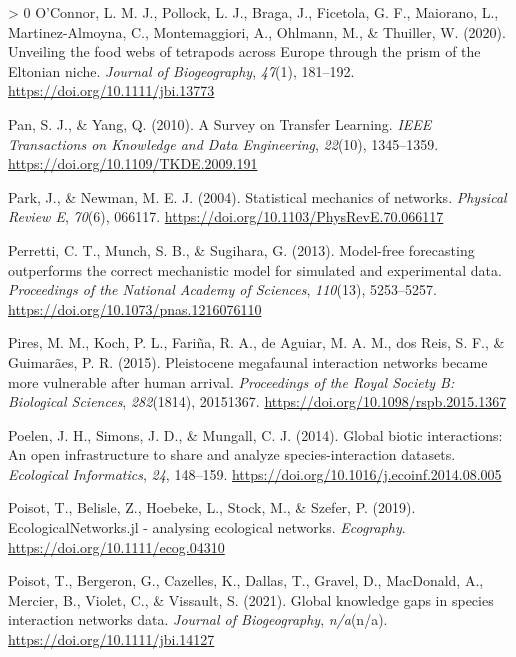 \documentclass[11pt]{article}
\newlength{\cslhangindent}
\newenvironment{CSLReferences}[3] %
 {%
  \setlength{\parindent}{0pt}
  \ifodd #1 \everypar{\setlength{\hangindent}{\cslhangindent}}\ignorespaces\fi
  \ifnum #2 > 0
  \setlength{\parskip}{#2\baselineskip}
  \fi
 }%
 {}
\begin{document}
\begin{CSLReferences}{1}{0}
\leavevmode\hypertarget{ref-OConnor2020UnvFoo}{}%
O'Connor, L. M. J., Pollock, L. J., Braga, J., Ficetola, G. F.,
Maiorano, L., Martinez-Almoyna, C., Montemaggiori, A., Ohlmann, M., \&
Thuiller, W. (2020). Unveiling the food webs of tetrapods across Europe
through the prism of the Eltonian niche. \emph{Journal of Biogeography},
\emph{47}(1), 181--192. \url{https://doi.org/10.1111/jbi.13773}

\leavevmode\hypertarget{ref-Pan2010SurTra}{}%
Pan, S. J., \& Yang, Q. (2010). A Survey on Transfer Learning.
\emph{IEEE Transactions on Knowledge and Data Engineering},
\emph{22}(10), 1345--1359. \url{https://doi.org/10.1109/TKDE.2009.191}

\leavevmode\hypertarget{ref-Park2004StaMec}{}%
Park, J., \& Newman, M. E. J. (2004). Statistical mechanics of networks.
\emph{Physical Review E}, \emph{70}(6), 066117.
\url{https://doi.org/10.1103/PhysRevE.70.066117}

\leavevmode\hypertarget{ref-Perretti2013ModFor}{}%
Perretti, C. T., Munch, S. B., \& Sugihara, G. (2013). Model-free
forecasting outperforms the correct mechanistic model for simulated and
experimental data. \emph{Proceedings of the National Academy of
Sciences}, \emph{110}(13), 5253--5257.
\url{https://doi.org/10.1073/pnas.1216076110}

\leavevmode\hypertarget{ref-Pires2015PleMeg}{}%
Pires, M. M., Koch, P. L., Fariña, R. A., de Aguiar, M. A. M., dos Reis,
S. F., \& Guimarães, P. R. (2015). Pleistocene megafaunal interaction
networks became more vulnerable after human arrival. \emph{Proceedings
of the Royal Society B: Biological Sciences}, \emph{282}(1814),
20151367. \url{https://doi.org/10.1098/rspb.2015.1367}

\leavevmode\hypertarget{ref-Poelen2014GloBio}{}%
Poelen, J. H., Simons, J. D., \& Mungall, C. J. (2014). Global biotic
interactions: An open infrastructure to share and analyze
species-interaction datasets. \emph{Ecological Informatics}, \emph{24},
148--159. \url{https://doi.org/10.1016/j.ecoinf.2014.08.005}

\leavevmode\hypertarget{ref-Poisot2019EcoJl}{}%
Poisot, T., Belisle, Z., Hoebeke, L., Stock, M., \& Szefer, P. (2019).
EcologicalNetworks.jl - analysing ecological networks. \emph{Ecography}.
\url{https://doi.org/10.1111/ecog.04310}

\leavevmode\hypertarget{ref-Poisot2021GloKno}{}%
Poisot, T., Bergeron, G., Cazelles, K., Dallas, T., Gravel, D.,
MacDonald, A., Mercier, B., Violet, C., \& Vissault, S. (2021). Global
knowledge gaps in species interaction networks data. \emph{Journal of
Biogeography}, \emph{n/a}(n/a). \url{https://doi.org/10.1111/jbi.14127}


\end{CSLReferences}
\end{document}
